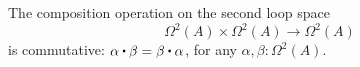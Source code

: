 \documentclass[hott-all.tex]{subfiles}
\begin{document}
%
%
%

\begin{thm}\label{thm:EckmannHilton}
  The composition operation on the second loop space
  \begin{equation*}
    \Omega^2(A)\times \Omega^2(A)\to \Omega^2(A)
  \end{equation*}
  is commutative: $\alpha\ct\beta = \beta\ct\alpha$, for any $\alpha, \beta:\Omega^2(A)$.
\end{thm}
\end{document}
